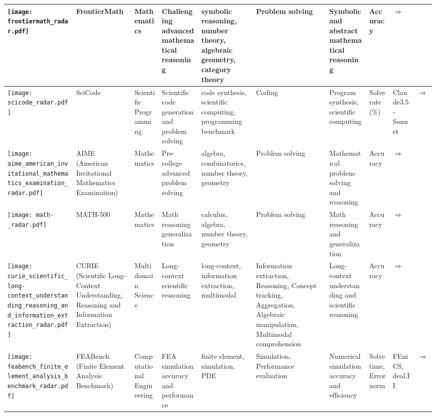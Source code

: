 \begin{landscape}
{\begin{longtable}{|p{}|p{}|p{}|p{}|p{}|p{}|p{}|p{}|p{}|p{}|}
\texttt{[image: frontiermath\_radar.pdf]} & FrontierMath & Mathematics & Challenging advanced mathematical reasoning & symbolic reasoning, number theory, algebraic geometry, category theory & Problem solving & Symbolic and abstract mathematical reasoning & Accuracy & \cite{glazer2024frontiermathbenchmarkevaluatingadvanced}\href{https://arxiv.org/abs/2411.04872}{$\Rightarrow$} \\ \hline
\texttt{[image: scicode\_radar.pdf]} & SciCode & Scientific Programming & Scientific code generation and problem solving & code synthesis, scientific computing, programming benchmark & Coding & Program synthesis, scientific computing & Solve rate (\%) & Claude3.5-Sonnet & \cite{tian2024scicoderesearchcodingbenchmark}\href{https://arxiv.org/abs/2407.13168}{$\Rightarrow$} \\ \hline
\texttt{[image: aime\_american\_invitational\_mathematics\_examination\_radar.pdf]} & AIME (American Invitational Mathematics Examination) & Mathematics & Pre-college advanced problem solving & algebra, combinatorics, number theory, geometry & Problem solving & Mathematical problem-solving and reasoning & Accuracy & \cite{www-aime}\href{https://artofproblemsolving.com/wiki/index.php/AIME\_Problems\_and\_Solutions}{$\Rightarrow$} \\ \hline
\texttt{[image: math-\_radar.pdf]} & MATH-500 & Mathematics & Math reasoning generalization & calculus, algebra, number theory, geometry & Problem solving & Math reasoning and generalization & Accuracy & \cite{huggingface2025math500}\href{https://huggingface.co/datasets/HuggingFaceH4/MATH-500}{$\Rightarrow$} \\ \hline
\texttt{[image: curie\_scientific\_long-context\_understanding\_reasoning\_and\_information\_extraction\_radar.pdf]} & CURIE (Scientific Long-Context Understanding, Reasoning and Information Extraction) & Multidomain Science & Long-context scientific reasoning & long-context, information extraction, multimodal & Information extraction, Reasoning, Concept tracking, Aggregation, Algebraic manipulation, Multimodal comprehension & Long-context understanding and scientific reasoning & Accuracy & \cite{curie2024}\href{https://arxiv.org/abs/2404.02029}{$\Rightarrow$} \\ \hline
\texttt{[image: feabench\_finite\_element\_analysis\_benchmark\_radar.pdf]} & FEABench (Finite Element Analysis Benchmark) & Computational Engineering & FEA simulation accuracy and performance & finite element, simulation, PDE & Simulation, Performance evaluation & Numerical simulation accuracy and efficiency & Solve time, Error norm & FEniCS, deal.II & \cite{allen2023feabench}\href{https://github.com/alleninstitute/feabench}{$\Rightarrow$} \\ \hline

\end{longtable}}
\end{landscape}
